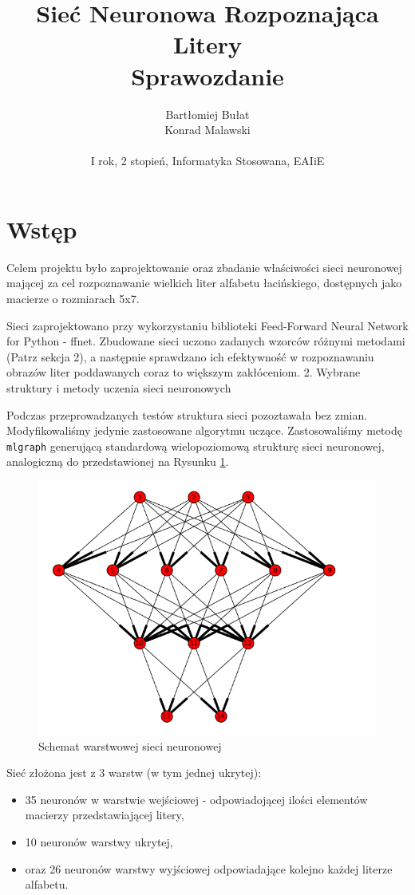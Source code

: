 \documentclass[a4paper]{article}
\title{Sieć Neuronowa Rozpoznająca Litery \\ Sprawozdanie}
\author{
Bartłomiej Bułat\\
Konrad Malawski\\
\\
I rok, 2 stopień, Informatyka Stosowana, EAIiE}
\begin{document}
\maketitle

\newpage
\section{Wstęp}

Celem projektu było zaprojektowanie oraz zbadanie właściwości sieci neuronowej mającej za cel rozpoznawanie wielkich liter alfabetu łacińskiego, 
dostępnych jako macierze o rozmiarach 5x7. 

Sieci zaprojektowano przy wykorzystaniu biblioteki Feed-Forward Neural Network for Python - ffnet. Zbudowane sieci uczono zadanych wzorców różnymi 
metodami (Patrz sekcja 2), a następnie sprawdzano ich efektywność w rozpoznawaniu obrazów liter poddawanych coraz to większym zakłóceniom.
2. Wybrane struktury i metody uczenia sieci neuronowych

Podczas przeprowadzanych testów struktura sieci pozoztawała bez zmian. Modyfikowaliśmy jedynie zastosowane algorytmu uczące. Zastosowaliśmy metodę
\verb|mlgraph| generującą standardową wielopoziomową strukturę sieci neuronowej, analogiczną do przedstawionej na Rysunku \ref{rys:graf}.

\begin{figure}[pht]
 \centering
 \includegraphics[scale=0.34]{mlgraph}
 \caption{Schemat warstwowej sieci neuronowej}\label{rys:graf}
\end{figure}


Sieć złożona jest z 3 warstw (w tym jednej ukrytej): 
\begin{itemize}
 \item 35 neuronów w warstwie wejściowej - odpowiadojącej ilości elementów macierzy przedstawiającej litery, 
 \item 10 neuronów warstwy ukrytej, 
 \item oraz 26 neuronów warstwy wyjściowej odpowiadające kolejno każdej literze alfabetu.
\end{itemize}
\end{document}
